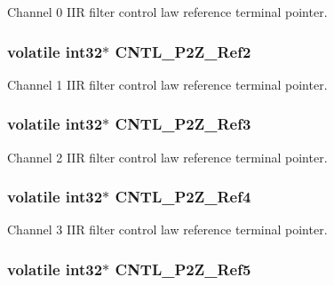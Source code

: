 Channel 0 I\-I\-R filter control law reference terminal pointer. \hypertarget{a00010_a9bf1756a901a3a74d9f43a51f85cede4}{
\subsubsection[{C\-N\-T\-L\-\_\-2\-P2\-Z\-\_\-\-Ref2}]{\setlength{\rightskip}{0pt plus 5cm}volatile int32$\ast$ C\-N\-T\-L\-\_\-P2\-Z\-\_\-\-Ref2}}\label{a00010_a9bf1756a901a3a74d9f43a51f85cede4}
Channel 1 I\-I\-R filter control law reference terminal pointer. \hypertarget{a00010_a859e9bbd5bc82f1b42863a93e4f992af}{
\subsubsection[{C\-N\-T\-L\-\_\-2\-P2\-Z\-\_\-\-Ref3}]{\setlength{\rightskip}{0pt plus 5cm}volatile int32$\ast$ C\-N\-T\-L\-\_\-P2\-Z\-\_\-\-Ref3}}\label{a00010_a859e9bbd5bc82f1b42863a93e4f992af}
Channel 2 I\-I\-R filter control law reference terminal pointer. \hypertarget{a00010_af54c55f228deb8189c44282a94a870c1}{
\subsubsection[{C\-N\-T\-L\-\_\-2\-P2\-Z\-\_\-\-Ref4}]{\setlength{\rightskip}{0pt plus 5cm}volatile int32$\ast$ C\-N\-T\-L\-\_\-P2\-Z\-\_\-\-Ref4}}\label{a00010_af54c55f228deb8189c44282a94a870c1}
Channel 3 I\-I\-R filter control law reference terminal pointer. \hypertarget{a00010_abd3b240e2d3f7d3f4f717066ee8efd3e}{
\subsubsection[{C\-N\-T\-L\-\_\-2\-P2\-Z\-\_\-\-Ref5}]{\setlength{\rightskip}{0pt plus 5cm}volatile int32$\ast$ C\-N\-T\-L\-\_\-P2\-Z\-\_\-\-Ref5}}\label{a00010_abd3b240e2d3f7d3f4f717066ee8efd3e}

